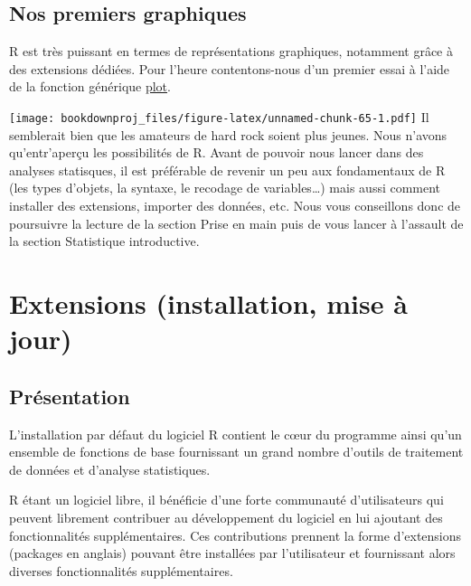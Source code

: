 \documentclass[
]{book}
\newenvironment{Shaded}{\begin{snugshade}}{\end{snugshade}}
\newcommand{\FunctionTok}[1]{\textcolor[rgb]{0.00,0.00,0.00}{#1}}
\newcommand{\NormalTok}[1]{#1}
\newcommand{\SpecialCharTok}[1]{\textcolor[rgb]{0.00,0.00,0.00}{#1}}
\begin{document}
\hypertarget{nos-premiers-graphiques}{%
\section{Nos premiers graphiques}\label{nos-premiers-graphiques}}

R est très puissant en termes de représentations graphiques, notamment grâce à des extensions dédiées. Pour l'heure contentons-nous d'un premier essai à l'aide de la fonction générique \href{http://rdrr.io/pkg/graphics/sym/plot}{plot}.

\begin{Shaded}
\end{Shaded}

\texttt{[image: bookdownproj\_files/figure-latex/unnamed-chunk-65-1.pdf]}
Il semblerait bien que les amateurs de hard rock soient plus jeunes.
Nous n'avons qu'entr'aperçu les possibilités de R. Avant de pouvoir nous lancer dans des analyses statisques, il est préférable de revenir un peu aux fondamentaux de R (les types d'objets, la syntaxe, le recodage de variables\ldots) mais aussi comment installer des extensions, importer des données, etc. Nous vous conseillons donc de poursuivre la lecture de la section Prise en main puis de vous lancer à l'assault de la section Statistique introductive.

\hypertarget{extensions-installation-mise-uxe0-jour}{%
\chapter{Extensions (installation, mise à jour)}\label{extensions-installation-mise-uxe0-jour}}

\hypertarget{pruxe9sentation}{%
\section{Présentation}\label{pruxe9sentation}}

L'installation par défaut du logiciel R contient le cœur du programme ainsi qu'un ensemble de fonctions de base fournissant un grand nombre d'outils de traitement de données et d'analyse statistiques.

R étant un logiciel libre, il bénéficie d'une forte communauté d'utilisateurs qui peuvent librement contribuer au développement du logiciel en lui ajoutant des fonctionnalités supplémentaires. Ces contributions prennent la forme d'extensions (packages en anglais) pouvant être installées par l'utilisateur et fournissant alors diverses fonctionnalités supplémentaires.
\end{document}
